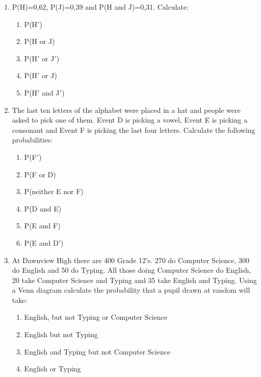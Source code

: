 \begin{enumerate}
\item P(H)=0,62, P(J)=0,39 and P(H and J)=0,31. Calculate:
	\begin{enumerate}
	\item P(H$'$) 
	\item P(H or J)
	\item P(H$'$ or J$'$)
	\item P(H$'$ or J)
	\item P(H$'$ and J$'$)
	\end{enumerate}
\item The last ten letters of the alphabet were placed in a hat and people were asked to pick one of them. Event D is picking a vowel, Event E is picking a consonant and Event F is picking the last four letters. Calculate the following probabilities:
	\begin{enumerate}
	\item P(F$'$) 
	\item P(F or D)
	\item P(neither E nor F)
	\item P(D and E)
	\item P(E and F)
	\item P(E and D$'$)
	\end{enumerate}
\item At Dawnview High there are 400 Grade 12's. 270 do Computer Science, 300 do English and 50 do Typing. All those doing Computer Science do English, 20 take Computer Science and Typing and 35 take English and Typing. Using a Venn diagram calculate the probability that a pupil drawn at random will take:
	\begin{enumerate}
	\item English, but not Typing or Computer Science 
	\item English but not Typing
	\item English and Typing but not Computer Science
	\item English or Typing
	\end{enumerate}   
\end{enumerate}










\appendix
